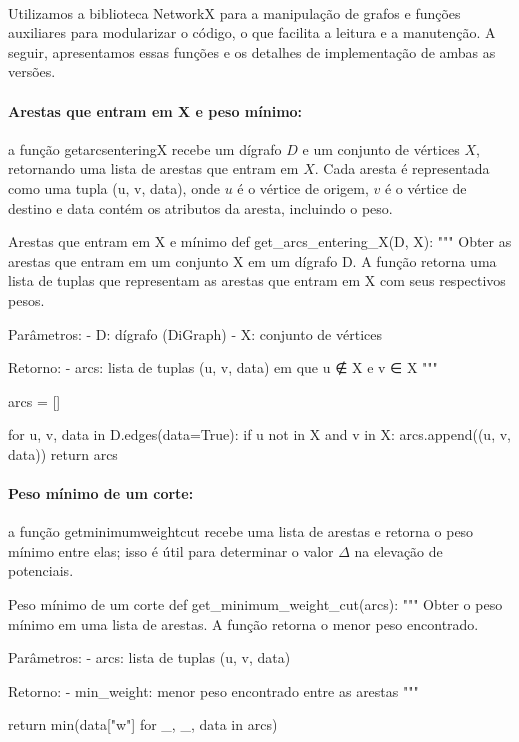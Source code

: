 \documentclass[12pt,a4paper]{article}
\def\texttt#1{#1}%
\def\_{}%
\begin{document}
\paragraph{}
Utilizamos a biblioteca NetworkX para a manipulação de grafos e funções auxiliares para modularizar o código, o que facilita a leitura e a manutenção. A seguir, apresentamos essas funções e os detalhes de implementação de ambas as versões.

\paragraph{Arestas que entram em X e peso mínimo:}
a função \texttt{get\_arcs\_entering\_X} recebe um dígrafo \(D\) e um conjunto de vértices \(X\), retornando uma lista de arestas que entram em \(X\). Cada aresta é representada como uma tupla \texttt{(u, v, data)}, onde \(u\) é o vértice de origem, \(v\) é o vértice de destino e \texttt{data} contém os atributos da aresta, incluindo o peso.

\begin{pybox}{Arestas que entram em X e mínimo}
def get_arcs_entering_X(D, X):
    """
    Obter as arestas que entram em um conjunto X em um dígrafo D.
    A função retorna uma lista de tuplas que representam as arestas que entram em X com seus respectivos pesos.

    Parâmetros:
    - D: dígrafo (DiGraph)
    - X: conjunto de vértices

    Retorno:
    - arcs: lista de tuplas (u, v, data) em que u ∉ X e v ∈ X
    """

    arcs = []

    for u, v, data in D.edges(data=True):
        if u not in X and v in X:
            arcs.append((u, v, data))
    return arcs
\end{pybox}

\paragraph{Peso mínimo de um corte:}
a função \texttt{get\_minimum\_weight\_cut} recebe uma lista de arestas e retorna o peso mínimo entre elas; isso é útil para determinar o valor $\Delta$ na elevação de potenciais.

\begin{pybox}{Peso mínimo de um corte}
def get_minimum_weight_cut(arcs):
    """
        Obter o peso mínimo em uma lista de arestas.
        A função retorna o menor peso encontrado.

        Parâmetros:
        - arcs: lista de tuplas (u, v, data)

        Retorno:
        - min_weight: menor peso encontrado entre as arestas
    """

    return min(data["w"] for _, _, data in arcs)
\end{pybox}    
\end{document}
